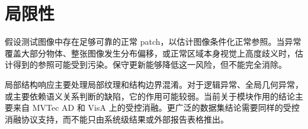 \section{局限性}
\label{sec:limitations}

\method{} 假设测试图像中存在足够可靠的正常 patch，以估计图像条件化正常参照。当异常覆盖大部分物体、整张图像发生分布偏移，或正常区域本身视觉上高度歧义时，估计得到的参照可能受到污染。保守更新能够降低这一风险，但不能完全消除。

局部结构响应主要处理局部纹理和结构边界混淆。对于逻辑异常、全局几何异常，或主要依赖语义关系判断的缺陷，它的作用可能较弱。当前关于模块作用的结论主要来自 MVTec AD 和 VisA 上的受控消融。更广泛的数据集结论需要同样的受控消融协议支持，而不能只由系统级结果或外部报告表格推出。
